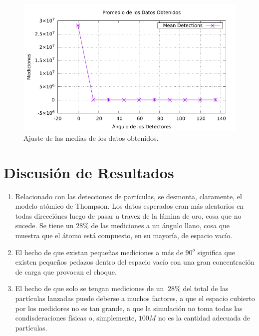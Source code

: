 \documentclass[conference]{IEEEtran}
\begin{document}
\begin{figure}[H]
	\centering
	\includegraphics[scale=0.5]{./Codigos/Ajuste.pdf}
	\caption{Ajuste de las medias de los datos obtenidos.}
	\label{ajuste}
\end{figure}



    
    
    
\section{Discusión de Resultados}
\begin{enumerate}
    \item Relacionado con las detecciones de partículas, se desmonta, claramente, el modelo atómico de Thompson. Los datos esperados eran más aleatorios en todas direcciónes luego de pasar a travez de la lámina de oro, cosa que no sucede. Se tiene un $28\%$ de las mediciones a un ángulo llano, cosa que muestra que el átomo está compuesto, en su mayoría, de espacio vacío.
    \item El hecho de que existan pequeñas mediciones a más de $90^o$ significa que existen pequeños pedazos dentro del espacio vacío con una gran concentración de carga que provocan el choque.
    \item El hecho de que solo se tengan mediciones de un $~28\%$ del total de las partículas lanzadas puede deberse a muchos factores, a que el espacio cubierto por los medidores no es tan grande, a que la simulación no toma todas las condisderaciones físicas o, simplemente, $100M$ no es la cantidad adecuada de partículas.
\end{enumerate}
\end{document}
